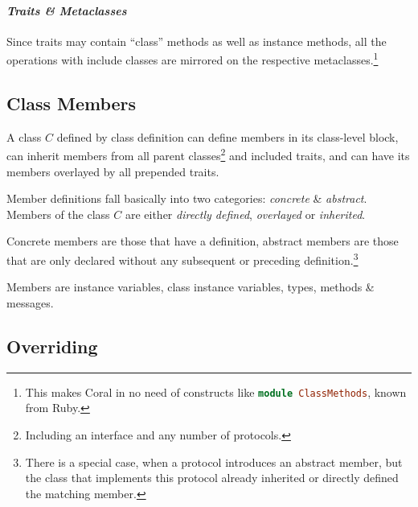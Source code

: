 \paragraph{\em Traits \& Metaclasses}
Since traits may contain ``class'' methods as well as instance methods, all the operations with include classes are mirrored on the respective metaclasses.\footnote{This makes Coral in no need of constructs like \lstinline[language=Ruby]!module ClassMethods!, known from Ruby.}





\subsection{Class Members}
\label{sec:class-members}

A class $C$ defined by class definition can define members in its class-level block, can inherit members from all parent classes\footnote{Including an interface and any number of protocols.} and included traits, and can have its members overlayed by all prepended traits. 

Member definitions fall basically into two categories: {\em concrete} \& {\em abstract}. Members of the class $C$ are either {\em directly defined}, {\em overlayed} or {\em inherited}. 

Concrete members are those that have a definition, abstract members are those that are only declared without any subsequent or preceding definition.\footnote{There is a special case, when a protocol introduces an abstract member, but the class that implements this protocol already inherited or directly defined the matching member.}

Members are instance variables, class instance variables, types, methods \& messages. 





\subsection{Overriding}
\label{sec:overriding}

